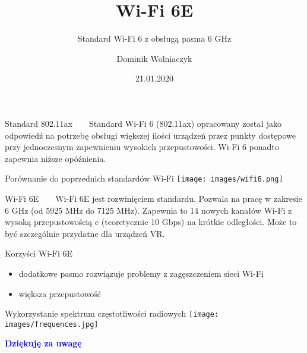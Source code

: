 \documentclass[aspectratio=43]{beamer}
\title{Wi-Fi 6E}
\subtitle{Standard Wi-Fi 6 z obsługą pasma 6 GHz}
\author{Dominik Wolniaczyk}
\date{21.01.2020}
\begin{document}
    \frame{\titlepage}
    \begin{frame}{Standard 802.11ax}
       Standard Wi-Fi 6 (802.11ax) opracowany został jako odpowiedź na potrzebę obsługi większej ilości urządzeń przez punkty dostępowe przy jednoczesnym zapewnieniu wysokich przepustowości. Wi-Fi 6 ponadto zapewnia niższe opóźnienia.
    \end{frame}
    
 \begin{frame}{Porównanie do poprzednich standardów Wi-Fi}
        \centering
        \texttt{[image: images/wifi6.png]}
    \end{frame}
    
    \begin{frame}{Wi-Fi 6E}
     Wi-Fi 6E jest rozwinięciem standardu. Pozwala na pracę w zakresie 6 GHz (od 5925 MHz do 7125 MHz). Zapewnia to 14 nowych kanałów Wi-Fi 
 z wysoką przepustowością e (teoretycznie 10 Gbps) na krótkie odległości. Może to być szczególnie przydatne dla urządzeń VR.
    \end{frame}
    
    \begin{frame}{Korzyści Wi-Fi 6E}
        \begin{itemize}
        \item dodatkowe pasmo rozwiązuje problemy z zagęszczeniem sieci Wi-Fi
        \item większa przepustowość
        \end{itemize}
    \end{frame}
    
      \begin{frame}{Wykorzystanie spektrum częstotliwości radiowych}
        \centering
        \texttt{[image: images/frequences.jpg]}
    \end{frame}
    
    \begin{frame}{}
        \centering
            \Huge\bfseries
        \textcolor{blue}{Dziękuję za uwagę}
    \end{frame}
\end{document}
